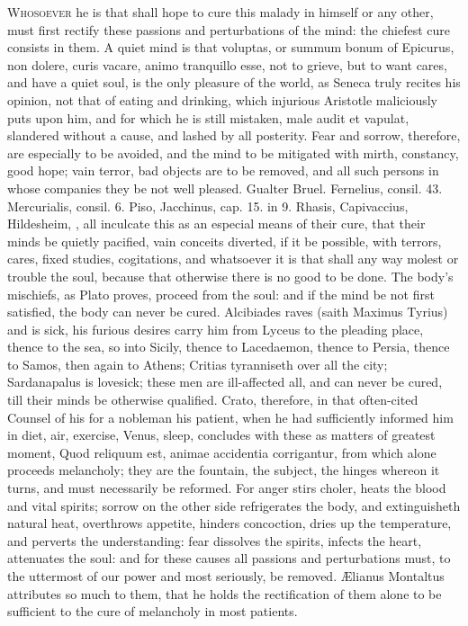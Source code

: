 {\lettrine{W}{hosoever} he is that shall hope to cure this malady in himself or any
other, must first rectify these passions and perturbations of the mind:
the chiefest cure consists in them. A quiet mind is that voluptas, or
summum bonum of Epicurus, non dolere, curis vacare, animo tranquillo
esse, not to grieve, but to want cares, and have a quiet soul, is the
only pleasure of the world, as Seneca truly recites his opinion, not
that of eating and drinking, which injurious Aristotle maliciously puts
upon him, and for which he is still mistaken, male audit et vapulat,
slandered without a cause, and lashed by all posterity. Fear and
sorrow, therefore, are especially to be avoided, and the mind to be
mitigated with mirth, constancy, good hope; vain terror, bad objects
are to be removed, and all such persons in whose companies they be not
well pleased. Gualter Bruel. Fernelius, consil. 43. Mercurialis,
consil. 6. Piso, Jacchinus, cap. 15. in 9. Rhasis, Capivaccius,
Hildesheim, \etc{}, all inculcate this as an especial means of their cure,
that their minds be quietly pacified, vain conceits diverted, if
it be possible, with terrors, cares,  fixed studies, cogitations,
and whatsoever it is that shall any way molest or trouble the soul,
because that otherwise there is no good to be done. The body's
mischiefs, as Plato proves, proceed from the soul: and if the mind be
not first satisfied, the body can never be cured. Alcibiades raves
(saith Maximus Tyrius) and is sick, his furious desires carry him
from Lyceus to the pleading place, thence to the sea, so into Sicily,
thence to Lacedaemon, thence to Persia, thence to Samos, then again to
Athens; Critias tyranniseth over all the city; Sardanapalus is
lovesick; these men are ill-affected all, and can never be cured, till
their minds be otherwise qualified. Crato, therefore, in that
often-cited Counsel of his for a nobleman his patient, when he had
sufficiently informed him in diet, air, exercise, Venus, sleep,
concludes with these as matters of greatest moment, Quod reliquum est,
animae accidentia corrigantur, from which alone proceeds melancholy;
they are the fountain, the subject, the hinges whereon it turns, and
must necessarily be reformed. For anger stirs choler, heats the
blood and vital spirits; sorrow on the other side refrigerates the
body, and extinguisheth natural heat, overthrows appetite, hinders
concoction, dries up the temperature, and perverts the understanding:
fear dissolves the spirits, infects the heart, attenuates the soul: and
for these causes all passions and perturbations must, to the uttermost
of our power and most seriously, be removed. \AE{}lianus Montaltus
attributes so much to them, that he holds the rectification of
them alone to be sufficient to the cure of melancholy in most patients.

}

